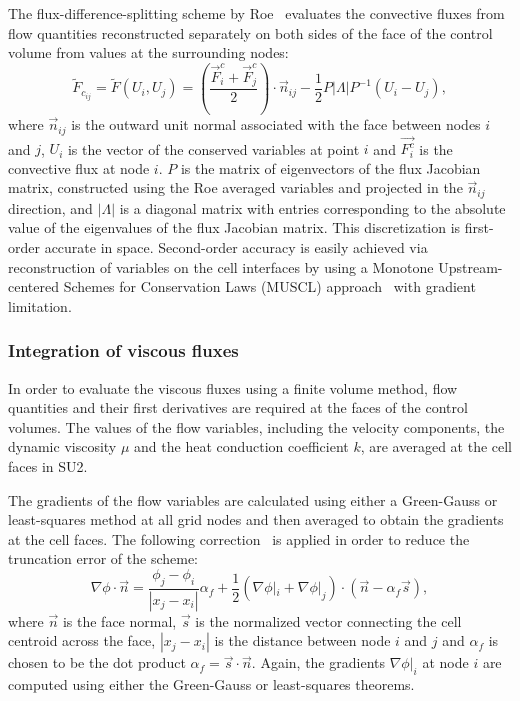 The flux-difference-splitting scheme by Roe~\cite{roe1981} evaluates the convective fluxes from flow quantities reconstructed separately on both sides of the face of the control volume from values at the surrounding nodes:
\begin{equation} \label{eq:roe}
\tilde{F}_{c_{ij}} = \tilde{F}(U_i, U_j) = \left(\frac{\vec{F}^c_i +\vec{F}^c_j}{2}\right)\cdot \vec{n}_{ij} - \frac{1}{2} P|\Lambda|P^{-1}(U_i - U_j), 
\end{equation}
where $\vec{n}_{ij}$ is the outward unit normal associated with the face between nodes $i$ and $j$, $U_i$ is the vector of the conserved variables at point $i$ and $\vec{F^c_i}$ is the convective flux at node $i$. $P$ is the matrix of eigenvectors of the flux Jacobian matrix, constructed using the Roe averaged variables and projected in the $\vec{n}_{ij}$ direction, and $|\Lambda|$ is a diagonal matrix with entries corresponding to the absolute value of the eigenvalues of the flux Jacobian matrix. This discretization is first-order accurate in space. Second-order accuracy is easily achieved via reconstruction of variables on the cell interfaces by using a Monotone Upstream-centered Schemes for Conservation Laws (MUSCL) approach~\cite{Leer1979} with gradient limitation.


\subsubsection*{Integration of viscous fluxes}

In order to evaluate the viscous fluxes using a finite volume method, flow quantities and their first derivatives are required at the faces of the control volumes. The values of the flow variables, including the velocity components, the dynamic viscosity $\mu$ and the heat conduction coefficient $k$, are averaged at the cell faces in SU2. 

The gradients of the flow variables are calculated using either a Green-Gauss or least-squares method at all grid nodes and then averaged to obtain the gradients at the cell faces. The following correction~\cite{weiss1997} is applied in order to reduce the truncation error of the scheme:
\begin{equation}
\nabla \phi \cdot \vec n = \frac{\phi_{j}-\phi_i}{|x_{j}-x_i|}\alpha_f + \frac{1}{2}(\nabla \phi|_i + \nabla \phi|_j)\cdot(\vec n-\alpha_f \vec s),
\end{equation}
where $\vec {n}$ is the face normal, $\vec s$ is the normalized vector connecting the cell centroid across the face, $|x_{j}-x_i|$ is the distance between node $i$ and $j$ and $\alpha _f$ is chosen to be the dot product $\alpha_f = \vec s\cdot \vec {n}$. Again, the gradients $\nabla \phi|_i$ at node $i$ are computed using either the Green-Gauss or least-squares theorems.

